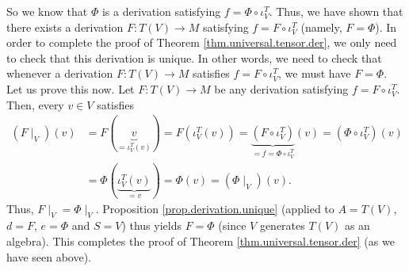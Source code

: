 \documentclass[etingof-lie.tex]{subfiles}
\begin{document}
So we know that $\Phi$ is a derivation satisfying $f=\Phi\circ\iota_{V}^{T}$.
Thus, we have shown that there exists a derivation $F:T\left(  V\right)
\rightarrow M$ satisfying $f=F\circ\iota_{V}^{T}$ (namely, $F=\Phi$). In order
to complete the proof of Theorem \ref{thm.universal.tensor.der}, we only need
to check that this derivation is unique. In other words, we need to check that
whenever a derivation $F:T\left(  V\right)  \rightarrow M$ satisfies
$f=F\circ\iota_{V}^{T}$, we must have $F=\Phi$. Let us prove this now. Let
$F:T\left(  V\right)  \rightarrow M$ be any derivation satisfying
$f=F\circ\iota_{V}^{T}$. Then, every $v\in V$ satisfies%
\begin{align*}
\left(  F\mid_{V}\right)  \left(  v\right)   &  =F\left(  \underbrace{v}%
_{=\iota_{V}^{T}\left(  v\right)  }\right)  =F\left(  \iota_{V}^{T}\left(
v\right)  \right)  =\underbrace{\left(  F\circ\iota_{V}^{T}\right)  }%
_{=f=\Phi\circ\iota_{V}^{T}}\left(  v\right)  =\left(  \Phi\circ\iota_{V}%
^{T}\right)  \left(  v\right) \\
&  =\Phi\left(  \underbrace{\iota_{V}^{T}\left(  v\right)  }_{=v}\right)
=\Phi\left(  v\right)  =\left(  \Phi\mid_{V}\right)  \left(  v\right)  .
\end{align*}
Thus, $F\mid_{V}=\Phi\mid_{V}$. Proposition \ref{prop.derivation.unique}
(applied to $A=T\left(  V\right)  $, $d=F$, $e=\Phi$ and $S=V$) thus yields
$F=\Phi$ (since $V$ generates $T\left(  V\right)  $ as an algebra). This
completes the proof of Theorem \ref{thm.universal.tensor.der} (as we have seen above).
\end{document}
